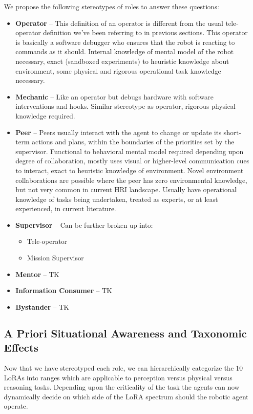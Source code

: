 \documentclass[letterpaper, 10 pt, conference]{ieeeconf} %
\begin{document}
We propose the following stereotypes of roles to answer these questions:
\begin{itemize}{}
  \item \textbf{Operator} -- This definition of an operator is different from the usual
    tele-operator definition we've been referring to in previous sections. This operator is
    basically a software debugger who ensures that the robot is reacting to commands as it should.
    Internal knowledge of mental model of the robot necessary, exact (sandboxed experiments) to
    heuristic knowledge about environment, some physical and rigorous operational task knowledge
    necessary.
  \item \textbf{Mechanic} -- Like an operator but debugs hardware with software interventions and
    hooks. Similar stereotype as operator, rigorous physical knowledge required.
  \item \textbf{Peer} -- Peers usually interact with the agent to change or update its short-term
    actions and plans, within the boundaries of the priorities set by the supervisor. Functional to
    behavioral mental model required depending upon degree of collaboration, mostly uses visual or
    higher-level communication cues to interact, exact to heuristic knowledge of environment. Novel
    environment collaborations are possible where the peer has zero environmental knowledge, but not
    very common in current HRI landscape. Usually have operational knowledge of tasks being
    undertaken, treated as experts, or at least experienced, in current literature.
  \item \textbf{Supervisor} -- Can be further broken up into:
    \begin{itemize}{}
      \item Tele-operator
      \item Mission Supervisor
    \end{itemize}
  \item \textbf{Mentor} -- TK
  \item \textbf{Information Consumer} -- TK
  \item \textbf{Bystander} -- TK
\end{itemize}

\subsection{A Priori Situational Awareness and Taxonomic Effects}

Now that we have stereotyped each role, we can hierarchically categorize the 10 LoRAs into ranges
which are applicable to perception versus physical versus reasoning tasks. Depending upon the
criticality of the task the agents can now dynamically decide on which side of the LoRA spectrum
should the robotic agent operate.
\end{document}
